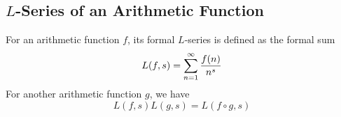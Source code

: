 \documentclass{article}
\begin{document}
\subsection{$L$-Series of an Arithmetic Function}
For an arithmetic function $f$, its formal $L$-series is defined as the formal sum
\begin{equation*}
  L(f, s) = \sum_{n=1}^\infty {f(n) \over n^s}
\end{equation*}
For another arithmetic function $g$, we have
\begin{equation*}
  L(f, s) L(g, s) = L(f \circ g, s)
\end{equation*}
\end{document}
